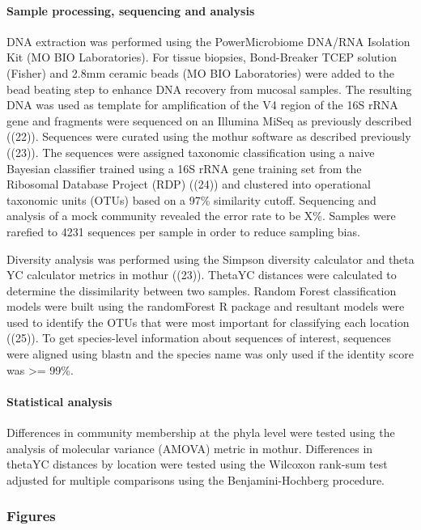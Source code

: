 \documentclass[11pt,]{article}
\let\oldparagraph\paragraph
\renewcommand{\paragraph}[1]{\oldparagraph{#1}\mbox{}}
\begin{document}
\paragraph{Sample processing, sequencing and
analysis}\label{sample-processing-sequencing-and-analysis}

DNA extraction was performed using the PowerMicrobiome DNA/RNA Isolation
Kit (MO BIO Laboratories). For tissue biopsies, Bond-Breaker TCEP
solution (Fisher) and 2.8mm ceramic beads (MO BIO Laboratories) were
added to the bead beating step to enhance DNA recovery from mucosal
samples. The resulting DNA was used as template for amplification of the
V4 region of the 16S rRNA gene and fragments were sequenced on an
Illumina MiSeq as previously described ((22)). Sequences were curated
using the mothur software as described previously ((23)). The sequences
were assigned taxonomic classification using a naive Bayesian classifier
trained using a 16S rRNA gene training set from the Ribosomal Database
Project (RDP) ((24)) and clustered into operational taxonomic units
(OTUs) based on a 97\% similarity cutoff. Sequencing and analysis of a
mock community revealed the error rate to be X\%. Samples were rarefied
to 4231 sequences per sample in order to reduce sampling bias.

Diversity analysis was performed using the Simpson diversity calculator
and theta YC calculator metrics in mothur ((23)). ThetaYC distances were
calculated to determine the dissimilarity between two samples. Random
Forest classification models were built using the randomForest R package
and resultant models were used to identify the OTUs that were most
important for classifying each location ((25)). To get species-level
information about sequences of interest, sequences were aligned using
blastn and the species name was only used if the identity score was
\textgreater{}= 99\%.

\paragraph{Statistical analysis}\label{statistical-analysis}

Differences in community membership at the phyla level were tested using
the analysis of molecular variance (AMOVA) metric in mothur. Differences
in thetaYC distances by location were tested using the Wilcoxon rank-sum
test adjusted for multiple comparisons using the Benjamini-Hochberg
procedure.

\newpage

\subsubsection{Figures}\label{figures}
\end{document}
